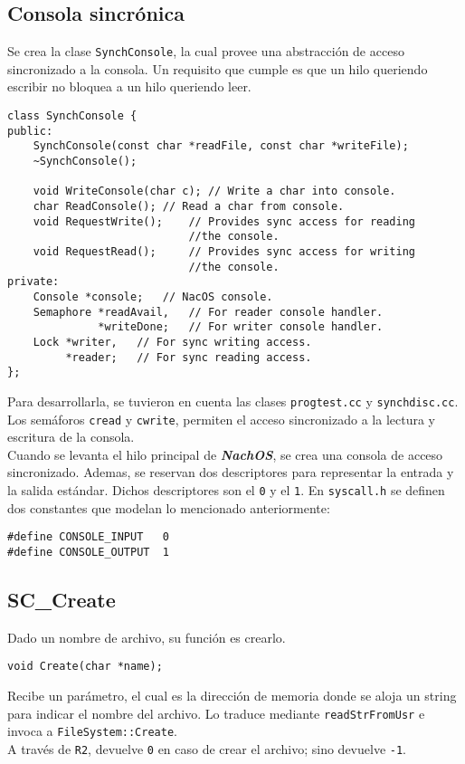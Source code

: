 \subsection*{Consola sincrónica}
Se crea la clase \texttt{SynchConsole}, la cual provee una abstracción de acceso sincronizado a la consola. Un requisito que cumple es que un hilo queriendo escribir no bloquea a un hilo queriendo leer.
\begin{lstlisting}[style=C]
class SynchConsole {
public:
	SynchConsole(const char *readFile, const char *writeFile);
	~SynchConsole();
	
    void WriteConsole(char c); // Write a char into console.
    char ReadConsole(); // Read a char from console.
    void RequestWrite();    // Provides sync access for reading
                            //the console.
    void RequestRead();     // Provides sync access for writing
                            //the console.
private: 
    Console *console;   // NacOS console.
    Semaphore *readAvail,   // For reader console handler.
              *writeDone;   // For writer console handler.
    Lock *writer,   // For sync writing access.
         *reader;   // For sync reading access.
};
\end{lstlisting}
Para desarrollarla, se tuvieron en cuenta las clases \texttt{progtest.cc} y \texttt{synchdisc.cc}.\\
Los semáforos \texttt{cread} y \texttt{cwrite}, permiten el acceso sincronizado a la lectura y escritura de la consola.\\
Cuando se levanta el hilo principal de \textbf{\textit{NachOS}}, se crea una consola de acceso sincronizado. Ademas, se reservan dos descriptores para representar la entrada y la salida estándar. Dichos descriptores son el \texttt{0} y el \texttt{1}. En \texttt{syscall.h} se definen dos constantes que modelan lo mencionado anteriormente:
\begin{lstlisting}
#define CONSOLE_INPUT	0
#define CONSOLE_OUTPUT	1
\end{lstlisting}
\newpage
\subsection*{SC\_Create}
Dado un nombre de archivo, su función es crearlo.
\begin{lstlisting}[style=C]
void Create(char *name);
\end{lstlisting}
Recibe un parámetro, el cual es la dirección de memoria donde se aloja un string para indicar el nombre del archivo. Lo traduce mediante \texttt{readStrFromUsr} e invoca a \texttt{FileSystem::Create}.\\
A través de \texttt{R2}, devuelve \texttt{0} en caso de crear el archivo; sino devuelve \texttt{-1}.
